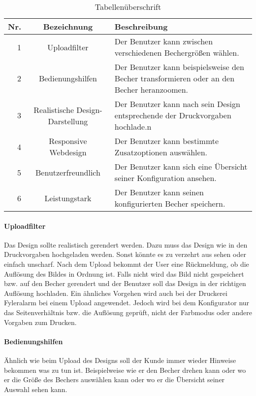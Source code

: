 \renewcommand{\arraystretch}{1.8}
\begin{table}
	\begin{tabular}{|r|c|p{8.5cm}|}
		\hline
		\textbf{Nr.} & \textbf{Bezeichnung} & \textbf{Beschreibung} \\
		\hline
		1 & Uploadfilter & Der Benutzer kann zwischen verschiedenen Bechergrößen wählen. \\
		\hline
		2 & Bedienungshilfen & Der Benutzer kann beispielsweise den Becher transformieren oder an den Becher heranzoomen. \\
		\hline
		3 & Realistische Design-Darstellung & Der Benutzer kann nach sein Design entsprechende der Druckvorgaben hochlade.n \\
		\hline
		4 & Responsive Webdesign & Der Benutzer kann bestimmte Zusatzoptionen auswählen. \\
		\hline
		5 & Benutzerfreundlich & Der Benutzer kann sich eine Übersicht seiner Konfiguration ansehen. \\
		\hline
		6 & Leistungstark & Der Benutzer kann seinen konfigurierten Becher speichern. \\
		\hline
	\end{tabular}
	\caption{Tabellenüberschrift}
\end{table}
%
\paragraph{Uploadfilter}
Das Design sollte realistisch gerendert werden. Dazu muss das Design wie in den Druckvorgaben hochgeladen werden. Sonst könnte es zu verzehrt aus sehen oder einfach unscharf. Nach dem Upload bekommt der User eine Rückmeldung, ob die Auflösung des Bildes in Ordnung ist. Falls nicht wird das Bild nicht gespeichert bzw. auf den Becher gerendert und der Benutzer soll das Design in der richtigen Auflösung hochladen. Ein ähnliches Vorgehen wird auch bei der Druckerei Fyleralarm bei einem Upload angewendet. Jedoch wird bei dem Konfigurator nur das Seitenverhältnis bzw. die Auflösung geprüft, nicht der Farbmodus oder andere Vorgaben zum Drucken.
%
\paragraph{Bedienungshilfen}
Ähnlich wie beim Upload des Designs soll der Kunde immer wieder Hinweise bekommen was zu tun ist. Beispielweise wie er den Becher drehen kann oder wo er die Größe des Bechers auswählen kann oder wo er die Übersicht seiner Auswahl sehen kann.
%

